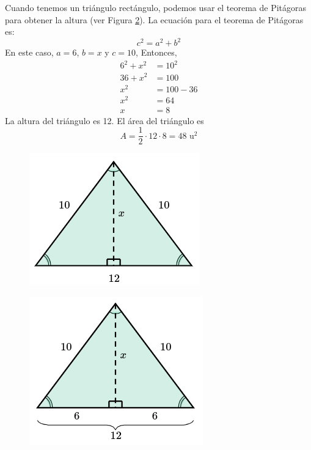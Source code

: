 \begin{solutionbox}{15cm}
\begin{minipage}{0.6\textwidth}
        Cuando tenemos un triángulo rectángulo, podemos usar el teorema de Pitágoras para obtener la altura (ver Figura \ref{fig:area_isoseles_01b}).
        La ecuación para el teorema de Pitágoras es:
        \[c^2=a^2+b^2\]
        En este caso, $a=6$, $b=x$ y $c=10$, Entonces,
        \begin{align*}
            6^2+x^2 & =10^2   \\
            36+x^2  & =100    \\
            x^2     & =100-36 \\
            x^2     & =64     \\
            x       & =8
        \end{align*}
        La altura del triángulo es 12.
        El área del triángulo es
        \[A=\frac{1}{2}\cdot 12 \cdot 8 = 48 \text{ u}^2\]
    \end{minipage}
    \begin{minipage}{0.35\textwidth}
        \begin{figure}[H]
            \centering
            \includegraphics[width=0.6\linewidth]{../images/area_isoseles_01a.png}
            \caption{}
            \label{fig:area_isoseles_01a}
        \end{figure}
        \begin{figure}[H]
            \centering
            \includegraphics[width=0.6\linewidth]{../images/area_isoseles_01b.png}
            \caption{}
            \label{fig:area_isoseles_01b}
        \end{figure}
    \end{minipage}
\end{solutionbox}